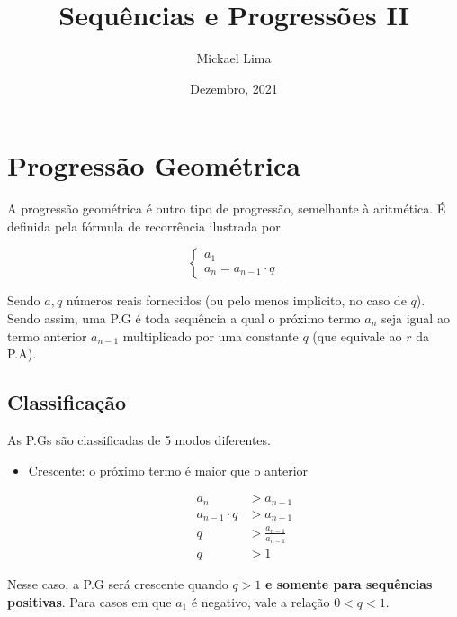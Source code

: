 \documentclass[11pt]{article}
\title{Sequências e Progressões II}
\author{Mickael Lima}
\date{Dezembro, 2021}
\begin{document}
\maketitle
\pagebreak
\tableofcontents
\pagebreak

\section{Progressão Geométrica}

A progressão geométrica é outro tipo de progressão, semelhante à aritmética. É definida pela fórmula de recorrência ilustrada por

\begin{equation*}
\begin{cases}
  a_{1} \\
  a_{n} = a_{n - 1} \cdot q
\end{cases}
\end{equation*}

Sendo $a, q$ números reais fornecidos (ou pelo menos implicito, no caso de $q$). Sendo assim, uma P.G é toda sequência a qual o próximo termo $a_{n}$ seja igual ao termo anterior $a_{n - 1}$ multiplicado por uma constante $q$ (que equivale ao $r$ da P.A).

\subsection{Classificação}

As P.Gs são classificadas de 5 modos diferentes.

\begin{tcolorbox}[colback=LightYellow]

\begin{itemize}
        \item Crescente: o próximo termo é maior que o anterior


      \begin{align*}
        a_{n} &> a_{n - 1} \\
        a_{n - 1} \cdot q &> a_{n - 1} \\
        q &> \frac{a_{n - 1}}{a_{n - 1}} \\
        q &> 1
      \end{align*}
\end{itemize}

Nesse caso, a P.G será crescente quando $q > 1$ \textbf{e somente para sequências positivas}. Para casos em que $a_{1}$ é negativo, vale a relação $0 < q < 1$.
\end{tcolorbox}
\end{document}
